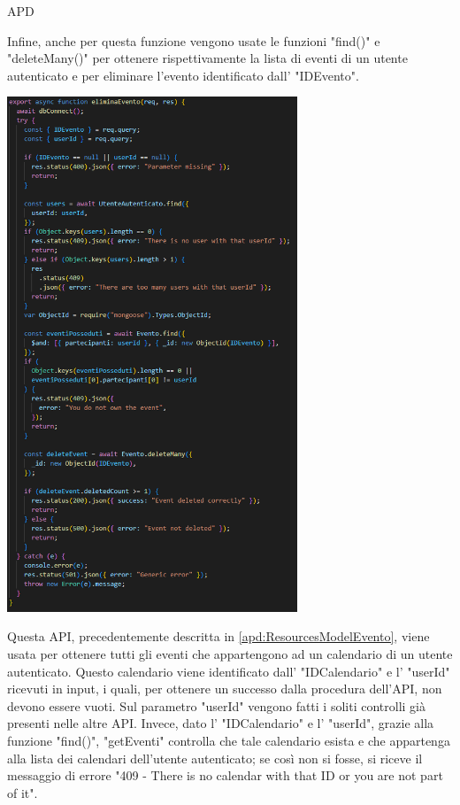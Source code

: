 \begin{listaPersonale} {APD}
\begin{listaPersonale2}[APD]{}
                Infine, anche per questa funzione vengono usate le funzioni "find()" e "deleteMany()" per ottenere rispettivamente la lista di eventi di un utente autenticato e per eliminare l'evento identificato dall' "IDEvento".
                \begin{center}
                    \includegraphics[width=0.65\textwidth, height=0.7\textheight]{img/png/APIs/eliminaEvento.png}
                \end{center}
                \newpage
                Questa API, precedentemente descritta in \ref{apd:ResourcesModelEvento}, viene usata per ottenere tutti gli eventi che appartengono ad un calendario di un utente autenticato. Questo calendario viene identificato dall' "IDCalendario" e l' "userId" ricevuti in input, i quali, per ottenere un successo dalla procedura dell'API, non devono essere vuoti. Sul parametro "userId" vengono fatti i soliti controlli già presenti nelle altre API. Invece, dato l' "IDCalendario" e l' "userId", grazie alla funzione "find()", "getEventi" controlla che tale calendario esista e che appartenga alla lista dei calendari dell'utente autenticato; se così non si fosse, si riceve il messaggio di errore "409 - There is no calendar with that ID or you are not part of it". \\

\end{listaPersonale2}
\end{listaPersonale}
